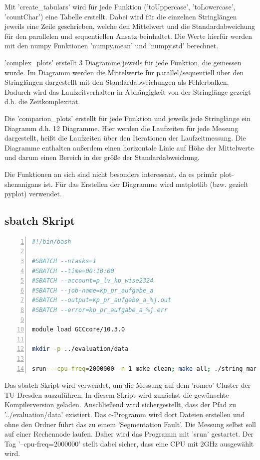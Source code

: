 \documentclass[plainarticle,zihtitle,german,final,hyperref,utf8]{zihpub}
\begin{document}
Mit 'create\_tabulars' wird für jede Funktion ('toUppercase', 'toLowercase', 'countChar') eine Tabelle erstellt. Dabei wird für die einzelnen Stringlängen jeweils eine Zeile geschrieben, welche den Mittelwert und die Standardabweichung für den parallelen und sequentiellen Ansatz beinhaltet. Die Werte hierfür werden mit den numpy Funktionen 'numpy.mean' und 'numpy.std' berechnet.

'complex\_plots' erstellt 3 Diagramme jeweils für jede Funktion, die gemessen wurde. Im Diagramm werden die Mittelwerte für parallel/sequentiell über den Stringlängen dargestellt mit den Standardabweichungen als Fehlerbalken. Dadurch wird das Laufzeitverhalten in Abhängigkeit von der Stringlänge gezeigt d.h. die Zeitkomplexität.

Die 'comparion\_plots' erstellt für jede Funktion und jeweils jede Stringlänge ein Diagramm d.h. 12 Diagramme.
Hier werden die Laufzeiten für jede Messung dargestellt, heißt die Laufzeiten über den Iterationen der Laufzeitmessung. Die Diagramme enthalten außerdem einen horizontale Linie auf Höhe der Mittelwerte und darum einen Bereich in der größe der Standardabweichung.

Die Funktionen an sich sind nicht besonders interessant, da es primär plot-shenanigans ist. Für das Erstellen der Diagramme wird matplotlib (bzw. gezielt pyplot) verwendet.

\subsection{sbatch Skript}

\begin{lstlisting}[language=bash, numbers=left]
#!/bin/bash

#SBATCH --ntasks=1                 
#SBATCH --time=00:10:00
#SBATCH --account=p_lv_kp_wise2324
#SBATCH --job-name=kp_pr_aufgabe_a
#SBATCH --output=kp_pr_aufgabe_a_%j.out
#SBATCH --error=kp_pr_aufgabe_a_%j.err
	
module load GCCcore/10.3.0

mkdir -p ../evaluation/data
	
srun --cpu-freq=2000000 -n 1 make clean; make all; ./string_manipulation
\end{lstlisting}

Das sbatch Skript wird verwendet, um die Messung auf dem 'romeo' Cluster der TU Dresden auszuführen.
In diesem Skript wird zunächst die gewünschte Kompilerversion geladen. Anschließend wird sichergestellt, dass der Pfad zu '../evaluation/data' existiert. Das c-Programm wird dort Dateien erstellen und ohne den Ordner führt das zu einem 'Segmentation Fault'.
Die Messung selbst soll auf einer Rechennode laufen. Daher wird das Programm mit 'srun' gestartet. Der Tag '--cpu-freq=2000000' stellt dabei sicher, dass eine CPU mit 2GHz ausgewählt wird.
\end{document}
